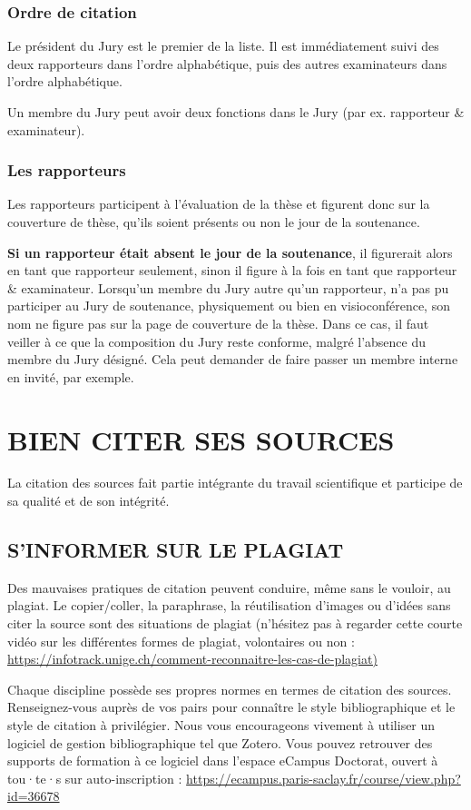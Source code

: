 \documentclass[main=french,a4paper]{book}
\begin{document}
\subsection{Ordre de citation}
Le président du Jury est le premier de la liste. Il est immédiatement suivi des deux rapporteurs dans l’ordre alphabétique, puis des autres examinateurs dans l’ordre alphabétique.\\ \par
Un membre du Jury peut avoir deux fonctions dans le Jury (par ex. rapporteur \& examinateur).
\subsection{Les rapporteurs}
Les rapporteurs participent à l’évaluation de la thèse et figurent donc sur la couverture de thèse, qu’ils soient présents ou non le jour de la soutenance.\\ \par 
\textbf{Si un rapporteur était absent le jour de la soutenance}, il figurerait alors en tant que rapporteur seulement, sinon il figure à la fois en tant que rapporteur \& examinateur.
Lorsqu’un membre du Jury autre qu’un rapporteur, n’a pas pu participer au Jury de soutenance, physiquement ou bien en visioconférence, son nom ne figure pas sur la page de couverture de la thèse. Dans ce cas, il faut veiller à ce que la composition du Jury reste conforme, malgré l’absence du membre du Jury désigné. Cela peut demander de faire passer un membre interne en invité, par exemple.

\chapter{BIEN CITER SES SOURCES}
La citation des sources fait partie intégrante du travail scientifique et participe de sa qualité et de son intégrité.
\section{S'INFORMER SUR LE PLAGIAT}
Des mauvaises pratiques de citation peuvent conduire, même sans le vouloir, au plagiat. Le copier/coller, la paraphrase, la réutilisation d’images ou d’idées sans citer la source sont des situations de plagiat (n’hésitez pas à regarder cette courte vidéo sur les différentes formes de plagiat, volontaires ou non : \url{https://infotrack.unige.ch/comment-reconnaitre-les-cas-de-plagiat)}\\ \par
Chaque discipline possède ses propres normes en termes de citation des sources. Renseignez-vous auprès de vos pairs pour connaître le style bibliographique et le style de citation à privilégier. Nous vous encourageons vivement à utiliser un logiciel de gestion bibliographique tel que Zotero. Vous pouvez retrouver des supports de formation à ce logiciel dans l’espace eCampus Doctorat, ouvert à tou·te·s sur auto-inscription : \url{https://ecampus.paris-saclay.fr/course/view.php?id=36678}
\end{document}
